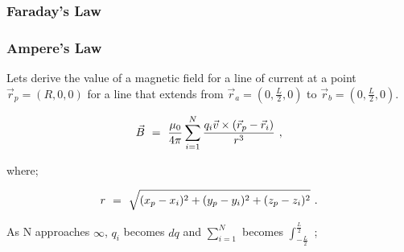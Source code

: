 \documentclass{article}
\begin{document}

\subsubsection{Faraday's Law}














\subsubsection{Ampere's Law}

Lets derive the value of a magnetic field for a line of current at a point \begin{math} \vec{r}_p = (R, 0, 0) \end{math} for a line that extends from \begin{math} \vec{r}_a = (0, \frac{L}{2}, 0) \end{math} to \begin{math} \vec{r}_b = (0, \frac{L}{2}, 0) \end{math}.

\begin{equation} \label{eq:51}
\vec{B} \hspace{0.125cm} = \hspace{0.125cm} \frac{\mu_{0}}{4 \pi} \sum_{i=1}^{N} \frac{q_{i} \vec{v} \times (\vec{r}_{p} - \vec{r}_{i})}{r^3} \hspace{0.125cm} ,
\end{equation}

where;

\begin{equation} \label{eq:51}
r \hspace{0.125cm} = \hspace{0.125cm} \sqrt{ (x_p - x_i)^2 + (y_p - y_i)^2 + (z_p - z_i)^2} \hspace{0.125cm} .
\end{equation}

As N approaches \begin{math} \infty \end{math}, \begin{math} q_i \end{math} becomes \begin{math} dq \end{math} and \begin{math} \sum_{i=1}^{N} \end{math} becomes \begin{math} \int_{-\frac{L}{2}}^{\frac{L}{2}} \end{math} ;
\end{document}
